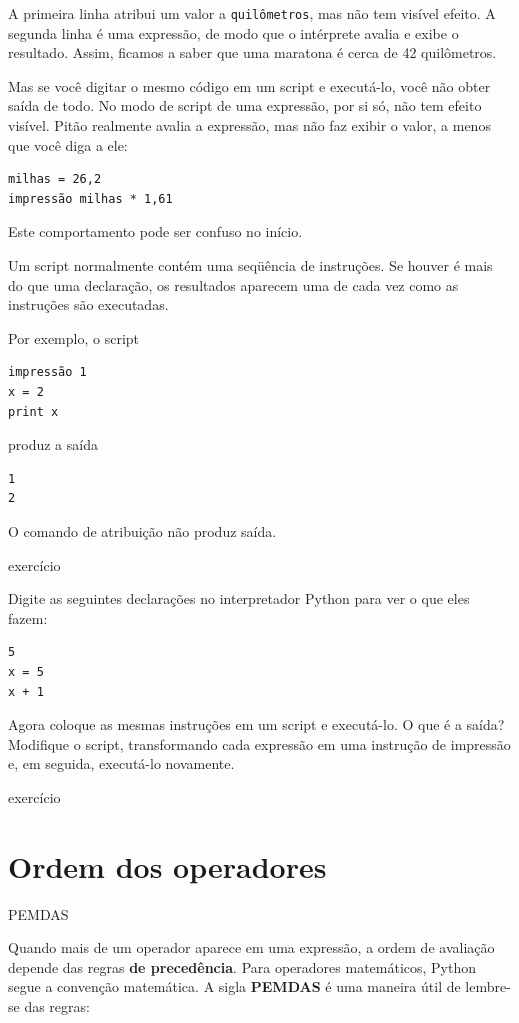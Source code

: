 \documentclass[10pt]{book}
\begin{document}
A primeira linha atribui um valor a {\tt quilômetros}, mas não tem visível
efeito. A segunda linha é uma expressão, de modo que o intérprete
avalia e exibe o resultado. Assim, ficamos a saber que uma maratona é
cerca de 42 quilômetros.

Mas se você digitar o mesmo código em um script e executá-lo, você não obter
saída de todo. No modo de script de uma expressão, por si só, não tem
efeito visível. Pitão realmente avalia a expressão, mas não faz
exibir o valor, a menos que você diga a ele:

\begin{verbatim}
milhas = 26,2
impressão milhas * 1,61
\end{verbatim}

Este comportamento pode ser confuso no início.

Um script normalmente contém uma seqüência de instruções. Se houver
é mais do que uma declaração, os resultados aparecem uma de cada vez
como as instruções são executadas.

Por exemplo, o script

\begin{verbatim}
impressão 1
x = 2
print x
\end{verbatim}
%
produz a saída

\begin{verbatim}
1
2
\end{verbatim}
%
O comando de atribuição não produz saída.

\begin{} exercício

Digite as seguintes declarações no interpretador Python para ver
o que eles fazem:

\begin{verbatim}
5
x = 5
x + 1
\end{verbatim}
%
Agora coloque as mesmas instruções em um script e executá-lo. O que
é a saída? Modifique o script, transformando cada
expressão em uma instrução de impressão e, em seguida, executá-lo novamente.
\end{} exercício


\section{Ordem dos operadores}
\index{} PEMDAS

Quando mais de um operador aparece em uma expressão, a ordem de
avaliação depende das regras {\bf de precedência}. Para
operadores matemáticos, Python segue a convenção matemática.
A sigla {\bf PEMDAS} é uma maneira útil de
lembre-se das regras:
\end{document}
